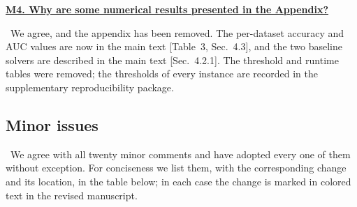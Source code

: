 \documentclass[11pt]{article}
\newcommand{\response}[1]{\smallskip\noindent{\color{blue!60!black}\textbf{Response.}}\ #1\par\medskip}
\newcommand{\loc}[1]{\textcolor{blue!50!black}{[#1]}}
\newenvironment{point}[1]{\medskip\noindent\textbf{\uline{#1}}\par}{\par}
\begin{document}
\begin{point}{M4. Why are some numerical results presented in the Appendix?}
\response{We agree, and the appendix has been removed. The per-dataset accuracy and AUC
values are now in the main text \loc{Table~3, Sec.~4.3}, and the two baseline solvers are
described in the main text \loc{Sec.~4.2.1}. The threshold and runtime tables were removed;
the thresholds of every instance are recorded in the supplementary reproducibility
package.}
\end{point}

\subsection*{Minor issues}

\ We agree with all twenty minor
comments and have adopted every one of them without exception. For conciseness we list
them, with the corresponding change and its location, in the table below; in each case the
change is marked in colored text in the revised manuscript.
\end{document}
